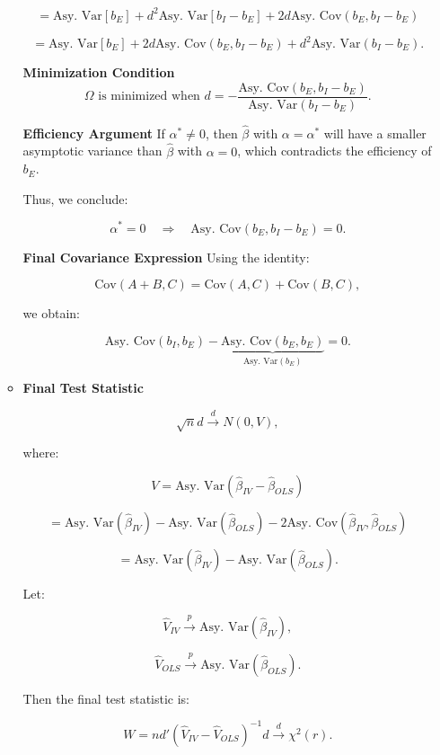 \documentclass[12pt, oneside]{article}
\begin{document}
\begin{enumerate}
\begin{itemize}
            \[
            = \text{Asy. Var}[b_E] + d^2 \text{Asy. Var}[b_I - b_E] + 2 d \text{Asy. Cov}(b_E, b_I - b_E)
            \]
            
            \[
            = \text{Asy. Var}[b_E] + 2 d \text{Asy. Cov}(b_E, b_I - b_E) + d^2 \text{Asy. Var}(b_I - b_E).
            \]
            
            \textbf{Minimization Condition}
            \[
            \Omega \text{ is minimized when } d = - \frac{\text{Asy. Cov}(b_E, b_I - b_E)}{\text{Asy. Var}(b_I - b_E)}.
            \]
            
            \textbf{Efficiency Argument}
            If \( \alpha^* \neq 0 \), then \( \hat{\beta} \) with \( \alpha = \alpha^* \) will have a smaller asymptotic variance than \( \hat{\beta} \) with \( \alpha = 0 \), which contradicts the efficiency of \( b_E \).
            
            Thus, we conclude:
            
            \[
            \alpha^* = 0 \quad \Rightarrow \quad \text{Asy. Cov}(b_E, b_I - b_E) = 0.
            \]
            
            \textbf{Final Covariance Expression}
            Using the identity:
            
            \[
            \text{Cov}(A + B, C) = \text{Cov}(A, C) + \text{Cov}(B, C),
            \]
            
            we obtain:
            
            \[
            \text{Asy. Cov}(b_I, b_E) - \underbrace{\text{Asy. Cov}(b_E, b_E)}_{\text{Asy. Var}(b_E)} = 0.
            \]
            
        \item \textbf{Final Test Statistic}

            \[
            \sqrt{n} d \xrightarrow{d} N(0, V),
            \]

            where:

            \[
            V = \text{Asy. Var}(\hat{\beta}_{IV} - \hat{\beta}_{OLS})
            \]

            \[
            = \text{Asy. Var}(\hat{\beta}_{IV}) - \text{Asy. Var}(\hat{\beta}_{OLS}) - 2 \text{Asy. Cov}(\hat{\beta}_{IV}, \hat{\beta}_{OLS})
            \]

            \[
            = \text{Asy. Var}(\hat{\beta}_{IV}) - \text{Asy. Var}(\hat{\beta}_{OLS}).
            \]

            Let:

            \[
            \hat{V}_{IV} \xrightarrow{p} \text{Asy. Var}(\hat{\beta}_{IV}),
            \]

            \[
            \hat{V}_{OLS} \xrightarrow{p} \text{Asy. Var}(\hat{\beta}_{OLS}).
            \]

            Then the final test statistic is:

            \[
            W = n d' (\hat{V}_{IV} - \hat{V}_{OLS})^{-1} d \xrightarrow{d} \chi^2(r).
            \]
        \end{itemize}
    \end{enumerate}
\end{document}
